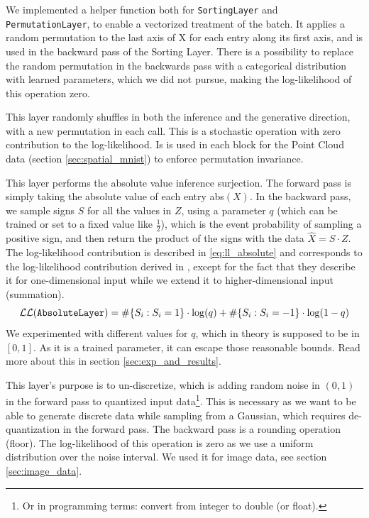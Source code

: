 We implemented a helper function both for \texttt{SortingLayer} and \texttt{PermutationLayer}, to enable a vectorized treatment of the batch. It applies a random permutation to the last axis of X for each entry along its first axis, and is used in the backward pass of the Sorting Layer. There is a possibility to replace the random permutation in the backwards pass with a categorical distribution with learned parameters, which we did not pursue, making the log-likelihood of this operation zero.


\label{sec:permutation_layer}
This layer randomly shuffles in both the inference and the generative direction, with a new permutation in each call. This is a stochastic operation with zero contribution to the log-likelihood. Is is used in each block for the Point Cloud data (section \ref{sec:spatial_mnist}) to enforce permutation invariance. 


\label{sec:absolute_layer}
This layer performs the absolute value inference surjection. The forward pass is simply taking the absolute value of each entry abs$(X)$. In the backward pass, we sample signs $S$ for all the values in $Z$, using a parameter $q$ (which can be trained or set to a fixed value like $\frac{1}{2}$), which is the event probability of sampling a positive sign, and then return the product of the signs with the data $\hat{X} = S \cdot Z$. The log-likelihood contribution is described in \eqref{eq:ll_absolute} and corresponds to the log-likelihood contribution derived in \cite{nielsen2020survae}, except for the fact that they describe it for one-dimensional input while we extend it to higher-dimensional input (summation). 
\begin{equation}
\mathcal{LL}\text{(\texttt{AbsoluteLayer})} = \#\{S_i : S_i = 1\} \cdot \log(q) +  \#\{S_i : S_i = -1\} \cdot \log(1 - q)  \label{eq:ll_absolute}
\end{equation}
We experimented with different values for $q$, which in theory is supposed to be in $[0,1]$. As it is a trained parameter, it can escape those reasonable bounds. Read more about this in section \ref{sec:exp_and_results}.


\label{sec:dequantization_layer}
This layer's purpose is to un-discretize, which is adding random noise in $(0,1)$ in the forward pass to quantized input data\footnote{Or in programming terms: convert from integer to double (or float).}. This is necessary as we want to be able to generate discrete data while sampling from a Gaussian, which requires de-quantization in the forward pass. The backward pass is a rounding operation (floor). The log-likelihood of this operation is zero as we use a uniform distribution over the noise interval. We used it for image data, see section \ref{sec:image_data}.



